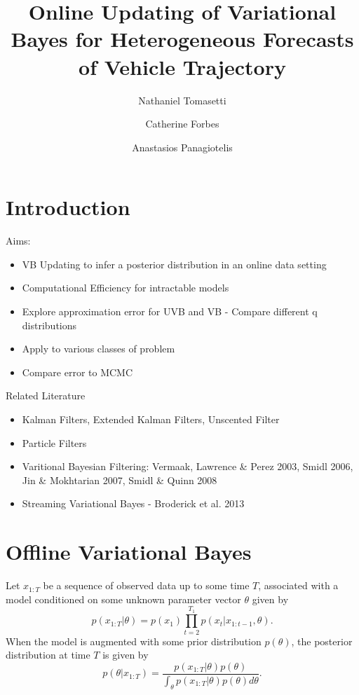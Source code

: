 \documentclass[12pt,a4paper]{article}\usepackage[]{graphicx}\usepackage[]{color}
\title{Online Updating of Variational Bayes for Heterogeneous Forecasts of Vehicle Trajectory}
\author{Nathaniel Tomasetti 
\and Catherine Forbes
\and Anastasios Panagiotelis}
\begin{document}
\maketitle



\section{Introduction}
\label{sec:intro}

Aims:
\begin{itemize}
\item VB Updating to infer a posterior distribution in an online data setting
\item Computational Efficiency for intractable models
\item Explore approximation error for UVB and VB - Compare different q distributions
\item Apply to various classes of problem
\item Compare error to MCMC
\end{itemize}

Related Literature
\begin{itemize}
\item Kalman Filters, Extended Kalman Filters, Unscented Filter
\item Particle Filters
\item Varitional Bayesian Filtering: Vermaak, Lawrence \& Perez 2003, Smidl 2006, Jin \& Mokhtarian 2007, Smidl \& Quinn 2008
\item Streaming Variational Bayes - Broderick et al. 2013
\end{itemize}

\section{Offline Variational Bayes}
\label{sec:Inference}

Let $x_{1:T}$ be a sequence of observed data up to some time $T$, associated with a model conditioned on some unknown parameter vector $\theta$ given by
\begin{equation}
\label{likelihood}
p(x_{1:T} | \theta) = p(x_1) \prod_{t=2}^{T_1} p(x_t | x_{1:t-1}, \theta).
\end{equation}
When the model is augmented with some prior distribution $p(\theta)$, the posterior distribution at time $T$ is given by
\begin{equation}
\label{posterior}
p(\theta | x_{1:T}) = \frac{p(x_{1:T} | \theta)p(\theta)}{\int_{\theta}p(x_{1:T} | \theta)p(\theta)d\theta}.
\end{equation}
\\
\end{document}

